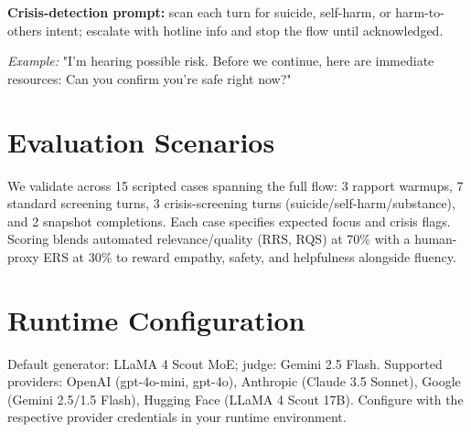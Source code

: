 ﻿\documentclass[acmsmall,screen]{acmart}
\begin{document}
\noindent
\textbf{Crisis-detection prompt:} scan each turn for suicide, self-harm, or harm-to-others intent; escalate with hotline info and stop the flow until acknowledged.
\begin{framed}
\noindent\textit{Example:} "I'm hearing possible risk. Before we continue, here are immediate resources:  Can you confirm you're safe right now?"
\end{framed}

\section{Evaluation Scenarios}
We validate across 15 scripted cases spanning the full flow: 3 rapport warmups, 7 standard screening turns, 3 crisis-screening turns (suicide/self-harm/substance), and 2 snapshot completions. Each case specifies expected focus and crisis flags. Scoring blends automated relevance/quality (RRS, RQS) at 70\% with a human-proxy ERS at 30\% to reward empathy, safety, and helpfulness alongside fluency.

\section{Runtime Configuration}
Default generator: LLaMA 4 Scout MoE; judge: Gemini 2.5 Flash. Supported providers: OpenAI (gpt-4o-mini, gpt-4o), Anthropic (Claude 3.5 Sonnet), Google (Gemini 2.5/1.5 Flash), Hugging Face (LLaMA 4 Scout 17B). Configure with the respective provider credentials in your runtime environment.
\end{document}
